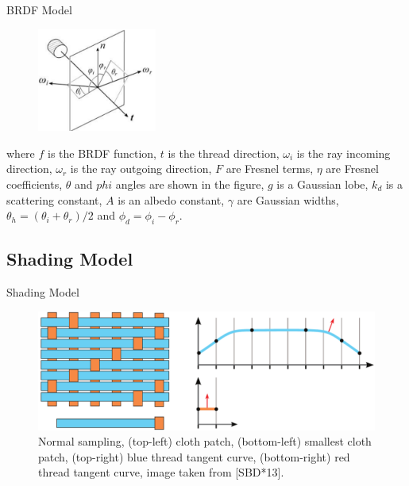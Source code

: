 \documentclass{beamer}
\begin{document}
\begin{frame}{BRDF Model}
\begin{multicols}{2}
\begin{figure}[htbp!]
\includegraphics[width=0.35\textwidth]{img/cloth_directions}
\label{fig:cloth_directions}
\end{figure}

\scriptsize{where $f$ is the BRDF function, $t$ is the thread direction, $\omega_i$ is the ray incoming direction, $\omega_r$ is the ray outgoing direction, $F$ are Fresnel terms, $\eta$ are Fresnel coefficients, $\theta$ and $phi$ angles are shown in the figure, $g$ is a Gaussian lobe, $k_d$ is a scattering constant, $A$ is an albedo constant, $\gamma$ are Gaussian widths, $\theta_h = (\theta_i+\theta_r)/2$ and $\phi_d = \phi_i-\phi_r$. }
\end{multicols}

\end{frame}

\subsection{Shading Model}
\begin{frame}{Shading Model}
\begin{figure}[b!]
\includegraphics[width=\textwidth]{img/tanget_curve}
\caption*{\tiny{Normal sampling, (top-left) cloth patch, (bottom-left) smallest cloth patch, (top-right) blue thread tangent curve, (bottom-right) red thread tangent curve, image taken from [SBD*13].}}
\end{figure}
\end{frame}
\end{document}
